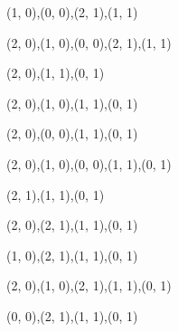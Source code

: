\begin{figure}[H]
\begin{subfigure}[b]{0.13\textwidth}
    \resizebox{\linewidth}{!} {
       {{(1, 0),(0, 0),(2, 1),(1, 1)}} {{}}
    }
  \end{subfigure}
  \begin{subfigure}[b]{0.13\textwidth}
    \resizebox{\linewidth}{!} {
       {{(2, 0),(1, 0),(0, 0),(2, 1),(1, 1)}} {{}}
    }
  \end{subfigure}
  \begin{subfigure}[b]{0.13\textwidth}
    \resizebox{\linewidth}{!} {
       {{(2, 0),(1, 1),(0, 1)}} {{}}
    }
  \end{subfigure}
  \begin{subfigure}[b]{0.13\textwidth}
    \resizebox{\linewidth}{!} {
       {{(2, 0),(1, 0),(1, 1),(0, 1)}} {{}}
    }
  \end{subfigure}
  \begin{subfigure}[b]{0.13\textwidth}
    \resizebox{\linewidth}{!} {
       {{(2, 0),(0, 0),(1, 1),(0, 1)}} {{}}
    }
  \end{subfigure}
  \begin{subfigure}[b]{0.13\textwidth}
    \resizebox{\linewidth}{!} {
       {{(2, 0),(1, 0),(0, 0),(1, 1),(0, 1)}} {{}}
    }
  \end{subfigure}
  \begin{subfigure}[b]{0.13\textwidth}
    \resizebox{\linewidth}{!} {
       {{(2, 1),(1, 1),(0, 1)}} {{}}
    }
  \end{subfigure}
  \begin{subfigure}[b]{0.13\textwidth}
    \resizebox{\linewidth}{!} {
       {{(2, 0),(2, 1),(1, 1),(0, 1)}} {{}}
    }
  \end{subfigure}
  \begin{subfigure}[b]{0.13\textwidth}
    \resizebox{\linewidth}{!} {
       {{(1, 0),(2, 1),(1, 1),(0, 1)}} {{}}
    }
  \end{subfigure}
  \begin{subfigure}[b]{0.13\textwidth}
    \resizebox{\linewidth}{!} {
       {{(2, 0),(1, 0),(2, 1),(1, 1),(0, 1)}} {{}}
    }
  \end{subfigure}
  \begin{subfigure}[b]{0.13\textwidth}
    \resizebox{\linewidth}{!} {
       {{(0, 0),(2, 1),(1, 1),(0, 1)}} {{}}
    }
  \end{subfigure}
  \begin{subfigure}[b]{0.13\textwidth}
    \resizebox{\linewidth}{!} {
}
\end{subfigure}
\end{figure}
